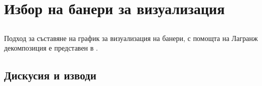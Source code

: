 \chapter{Избор на банери за визуализация}

\section{}

Подход за съставяне на график за визуализация на банери, с помощта на Лагранж декомпозиция е представен в \cite{10.1145/945846.945848}.

\section{}

\section{}

\section{Дискусия и изводи}
